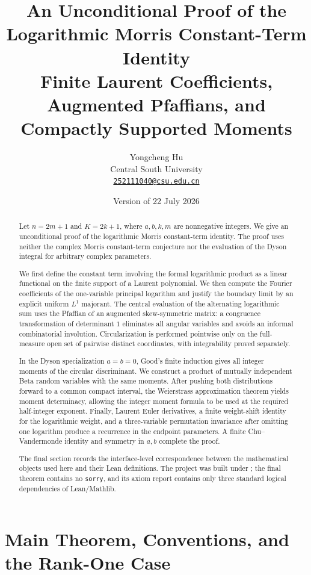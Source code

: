 \documentclass[11pt,a4paper]{article}
\title{\bfseries An Unconditional Proof of the Logarithmic Morris
Constant-Term Identity\\[5pt]
\large Finite Laurent Coefficients, Augmented Pfaffians,
and Compactly Supported Moments}
\author{Yongcheng Hu\\
Central South University\\
\href{mailto:252111040@csu.edu.cn}{\texttt{252111040@csu.edu.cn}}}
\date{Version of 22 July 2026}
\theoremstyle{definition}
\begin{document}
\maketitle

\begin{abstract}
Let $n=2m+1$ and $K=2k+1$, where $a,b,k,m$ are nonnegative
integers. We give an unconditional proof of the logarithmic Morris
constant-term identity. The proof uses neither the complex Morris
constant-term conjecture nor the evaluation of the Dyson integral for
arbitrary complex parameters.

We first define the constant term involving the formal logarithmic product
as a linear functional on the finite support of a Laurent polynomial. We
then compute the Fourier coefficients of the one-variable principal
logarithm and justify the boundary limit by an explicit uniform
$L^1$ majorant. The central evaluation of the alternating logarithmic sum
uses the Pfaffian of an augmented skew-symmetric matrix: a congruence
transformation of determinant $1$ eliminates all angular variables and
avoids an informal combinatorial involution. Circularization is performed
pointwise only on the full-measure open set of pairwise distinct
coordinates, with integrability proved separately.

In the Dyson specialization $a=b=0$, Good's finite induction gives all
integer moments of the circular discriminant. We construct a product of
mutually independent Beta random variables with the same moments. After
pushing both distributions forward to a common compact interval, the Weierstrass
approximation theorem yields moment determinacy, allowing the integer
moment formula to be used at the required half-integer exponent. Finally,
Laurent Euler derivatives, a finite weight-shift identity for the logarithmic
weight, and a three-variable permutation invariance after omitting one
logarithm produce a recurrence in the endpoint parameters. A finite
Chu--Vandermonde identity and symmetry in $a,b$ complete the proof.

The final section records the interface-level correspondence between the
mathematical objects used here and their Lean definitions. The project was
built under ; the final theorem contains no
\texttt{sorry}, and its axiom report contains only three standard logical
dependencies of Lean/Mathlib.
\end{abstract}

\tableofcontents

\section{Main Theorem, Conventions, and the Rank-One Case}
\end{document}

